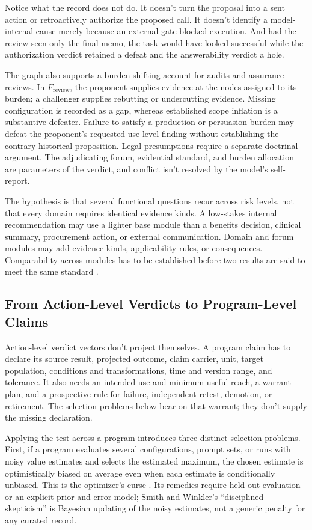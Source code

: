 Notice what the record does not do. It doesn't turn the proposal into a sent action or retroactively authorize the proposed call. It doesn't identify a model-internal cause merely because an external gate blocked execution. And had the review seen only the final memo, the task would have looked successful while the authorization verdict retained a defeat and the answerability verdict a hole.

The graph also supports a burden-shifting account for audits and assurance reviews. In \(F_{\mathrm{review}}\), the proponent supplies evidence at the nodes assigned to its burden; a challenger supplies rebutting or undercutting evidence. Missing configuration is recorded as a gap, whereas established scope inflation is a substantive defeater. Failure to satisfy a production or persuasion burden may defeat the proponent's requested use-level finding without establishing the contrary historical proposition. Legal presumptions require a separate doctrinal argument. The adjudicating forum, evidential standard, and burden allocation are parameters of the verdict, and conflict isn't resolved by the model's self-report.

The hypothesis is that several functional questions recur across risk levels, not that every domain requires identical evidence kinds. A low-stakes internal recommendation may use a lighter base module than a benefits decision, clinical summary, procurement action, or external communication. Domain and forum modules may add evidence kinds, applicability rules, or consequences. Comparability across modules has to be established before two results are said to meet the same standard \citep{messick1995validityStandards}.

\FloatBarrier
\subsection{From Action-Level Verdicts to Program-Level Claims}

Action-level verdict vectors don't project themselves. A program claim has to declare its source result, projected outcome, claim carrier, unit, target population, conditions and transformations, time and version range, and tolerance. It also needs an intended use and minimum useful reach, a warrant plan, and a prospective rule for failure, independent retest, demotion, or retirement. The selection problems below bear on that warrant; they don't supply the missing declaration.

Applying the test across a program introduces three distinct selection problems. First, if a program evaluates several configurations, prompt sets, or runs with noisy value estimates and selects the estimated maximum, the chosen estimate is optimistically biased on average even when each estimate is conditionally unbiased. This is the optimizer's curse \citep{smith2006optimizersCurse}. Its remedies require held-out evaluation or an explicit prior and error model; Smith and Winkler's \enquote{disciplined skepticism} is Bayesian updating of the noisy estimates, not a generic penalty for any curated record.

